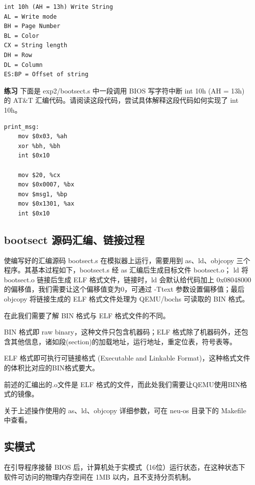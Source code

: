 \begin{lstlisting}
int 10h (AH = 13h) Write String
AL = Write mode
BH = Page Number
BL = Color 
CX = String length
DH = Row
DL = Column
ES:BP = Offset of string
\end{lstlisting}

\begin{mdframed}[hidealllines=true,backgroundcolor=gray!20]
\textbf{练习 }下面是 exp2/bootsect.s 中一段调用 BIOS 写字符中断 int 10h (AH = 13h) 的 AT\&T 汇编代码。请阅读这段代码，尝试具体解释这段代码如何实现了 int 10h。

\begin{lstlisting}
print_msg:
	mov	$0x03, %ah
	xor	%bh, %bh
	int	$0x10
	
	mov	$20, %cx
	mov	$0x0007, %bx	
	mov $msg1, %bp
	mov	$0x1301, %ax
	int	$0x10
\end{lstlisting}

\end{mdframed}

\subsection{bootsect 源码汇编、链接过程}

使编写好的汇编源码 bootsect.s 在模拟器上运行，需要用到 as、ld、objcopy 三个程序。其基本过程如下，bootsect.s 经 as 汇编后生成目标文件 bootsect.o； ld 将 bootsect.o 链接后生成 ELF 格式文件，链接时，ld 会默认给代码加上 0x08048000 的偏移值，我们需要让这个偏移值变为0，可通过 -Ttext 参数设置偏移值；最后 objcopy 将链接生成的 ELF 格式文件处理为 QEMU/bochs 可读取的 BIN 格式。

在此我们需要了解 BIN 格式与 ELF 格式文件的不同。

BIN 格式即 raw binary，这种文件只包含机器码；ELF 格式除了机器码外，还包含其他信息，诸如段(section)的加载地址，运行地址，重定位表，符号表等。

ELF 格式即可执行可链接格式 (Executable and Linkable Format)，这种格式文件的体积比对应的BIN格式要大。

前述的汇编出的.o文件是 ELF 格式的文件，而此处我们需要让QEMU使用BIN格式的镜像。

关于上述操作使用的 as、ld、objcopy 详细参数，可在 neu-os 目录下的 Makefile 中查看。

\subsection{实模式}

在引导程序接替 BIOS 后，计算机处于实模式（16位）运行状态，在这种状态下软件可访问的物理内存空间在 1MB 以内，且不支持分页机制。

